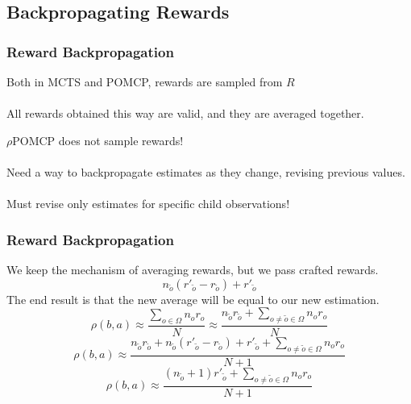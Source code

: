 \documentclass[xcolor={dvipsnames}]{beamer}
\begin{document}
\subsection{Backpropagating Rewards}
\begin{frame}
\frametitle{Reward Backpropagation}
\begin{block}{}
Both in MCTS and POMCP, rewards are sampled from $R$ \\~\\
All rewards obtained this way are valid, and they are averaged together.
\end{block}
\begin{block}{}
$\rho$POMCP does not sample rewards! \\~\\
Need a way to backpropagate estimates as they change, revising previous values. \\~\\
Must revise only estimates for specific child observations!
\end{block}
\end{frame}

\begin{frame}
\frametitle{Reward Backpropagation}
\begin{block}{}
We keep the mechanism of averaging rewards, but we pass crafted rewards.
\begin{equation}
n_{\tilde{o}}(r'_{\tilde{o}} - r_{\tilde{o}}) + r'_{\tilde{o}} \nonumber
\end{equation}
The end result is that the new average will be equal to our new estimation.
\begin{equation}
\rho(b,a) \approx \frac{\sum_{o\in\Omega} n_o r_o}{N} \approx \frac{ n_{\tilde{o}} r_{\tilde{o}} + \sum_{o \neq \tilde{o} \in \Omega} n_o r_o}{N} \nonumber
\end{equation}
\begin{equation}
\rho(b,a) \approx \frac{ n_{\tilde{o}} r_{\tilde{o}} + n_{\tilde{o}}(r'_{\tilde{o}} - r_{\tilde{o}}) + r'_{\tilde{o}} + \sum_{o \neq \tilde{o} \in \Omega} n_o r_o}{N+1} \nonumber
\end{equation}
\begin{equation}
\rho(b,a) \approx \frac{ ( n_{\tilde{o}}+1) r'_{\tilde{o}} + \sum_{o \neq \tilde{o} \in \Omega} n_o r_o}{N+1} \nonumber
\end{equation}
\end{block}
\end{frame}
\end{document}
